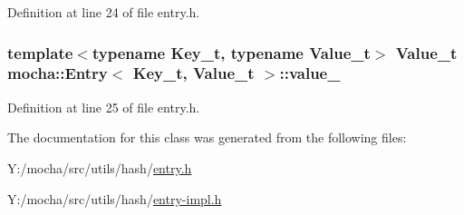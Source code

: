 Definition at line 24 of file entry.h.

\hypertarget{classmocha_1_1_entry_a51ccc8110ab957f74bfa0812cbd974b6}{
\subsubsection[{value\_\-}]{\setlength{\rightskip}{0pt plus 5cm}template$<$typename Key\_\-t, typename Value\_\-t$>$ Value\_\-t {\bf mocha::Entry}$<$ Key\_\-t, Value\_\-t $>$::{\bf value\_\-}}}
\label{classmocha_1_1_entry_a51ccc8110ab957f74bfa0812cbd974b6}


Definition at line 25 of file entry.h.



The documentation for this class was generated from the following files:\begin{DoxyCompactItemize}
\item 
Y:/mocha/src/utils/hash/\hyperlink{entry_8h}{entry.h}\item 
Y:/mocha/src/utils/hash/\hyperlink{entry-impl_8h}{entry-\/impl.h}\end{DoxyCompactItemize}
